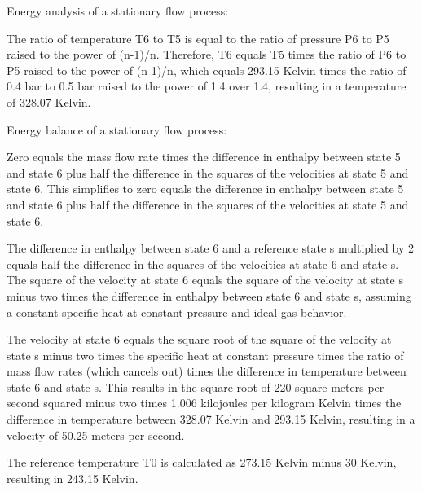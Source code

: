 Energy analysis of a stationary flow process:

The ratio of temperature T6 to T5 is equal to the ratio of pressure P6 to P5 raised to the power of (n-1)/n. Therefore, T6 equals T5 times the ratio of P6 to P5 raised to the power of (n-1)/n, which equals 293.15 Kelvin times the ratio of 0.4 bar to 0.5 bar raised to the power of 1.4 over 1.4, resulting in a temperature of 328.07 Kelvin.

Energy balance of a stationary flow process:

Zero equals the mass flow rate times the difference in enthalpy between state 5 and state 6 plus half the difference in the squares of the velocities at state 5 and state 6. This simplifies to zero equals the difference in enthalpy between state 5 and state 6 plus half the difference in the squares of the velocities at state 5 and state 6.

The difference in enthalpy between state 6 and a reference state s multiplied by 2 equals half the difference in the squares of the velocities at state 6 and state s. The square of the velocity at state 6 equals the square of the velocity at state s minus two times the difference in enthalpy between state 6 and state s, assuming a constant specific heat at constant pressure and ideal gas behavior.

The velocity at state 6 equals the square root of the square of the velocity at state s minus two times the specific heat at constant pressure times the ratio of mass flow rates (which cancels out) times the difference in temperature between state 6 and state s. This results in the square root of 220 square meters per second squared minus two times 1.006 kilojoules per kilogram Kelvin times the difference in temperature between 328.07 Kelvin and 293.15 Kelvin, resulting in a velocity of 50.25 meters per second.

The reference temperature T0 is calculated as 273.15 Kelvin minus 30 Kelvin, resulting in 243.15 Kelvin.